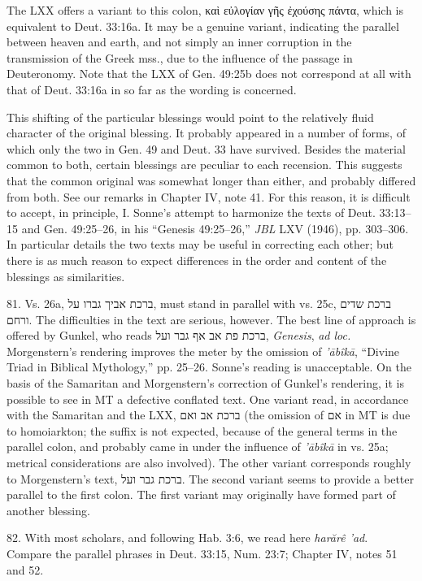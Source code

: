 \begin{enumerate}
The LXX offers a variant to this colon, καὶ εὐλογίαν γῆς ἐχούσης πάντα, which
is equivalent to Deut. 33:16a. It may be a genuine variant, indicating the
parallel between heaven and earth, and not simply an inner corruption in the
transmission of the Greek mss., due to the influence of the passage in
Deuteronomy. Note that the LXX of Gen. 49:25b does not correspond at all with
that of Deut. 33:16a in so far as the wording is concerned.

This shifting of the particular blessings would point to the relatively fluid
character of the original blessing. It probably appeared in a number of forms,
of which only the two in Gen. 49 and Deut. 33 have survived. Besides the
material common to both, certain blessings are peculiar to each recension. This
suggests that the common original was somewhat longer than either, and probably
differed from both. See our remarks in Chapter IV, note 41. For this reason, it
is difficult to accept, in principle, I. Sonne's attempt to harmonize the texts
of Deut. 33:13--15 and Gen. 49:25--26, in his ``Genesis 49:25--26,'' \emph{JBL}
LXV (1946), pp. 303--306. In particular details the two texts may be useful in
correcting each other; but there is as much reason to expect differences in the
order and content of the blessings as similarities.

81. Vs. 26a, ברכת אביך גברו על, must stand in parallel with vs. 25c,
ברכת שדים ורחם. The difficulties in the text are serious, however. The best
line of approach is offered by Gunkel, who reads ברכת פת אב אף גבר ועל,
\emph{Genesis}, \emph{ad loc.} Morgenstern's rendering improves the meter by
the omission of \emph{'ābîkā}, ``Divine Triad in Biblical Mythology,''
pp. 25--26. Sonne's reading is unacceptable. On the basis of the Samaritan and
Morgenstern's correction of Gunkel's rendering, it is possible to see in MT a
defective conflated text. One variant read, in accordance with the Samaritan
and the LXX, ברכת אב ואם (the omission of אם in MT is due to homoiarkton; the
suffix is not expected, because of the general terms in the parallel colon,
and probably came in under the influence of \emph{'ābîkā} in vs. 25a;
metrical considerations are also involved). The other variant corresponds
roughly to Morgenstern's text, ברכת גבר ועל. The second variant seems to
provide a better parallel to the first colon. The first variant may originally
have formed part of another blessing.

82. With most scholars, and following Hab. 3:6, we read here
\emph{harărê 'ad}. Compare the parallel phrases in Deut. 33:15, Num. 23:7;
Chapter IV, notes 51 and 52.


\end{enumerate}
